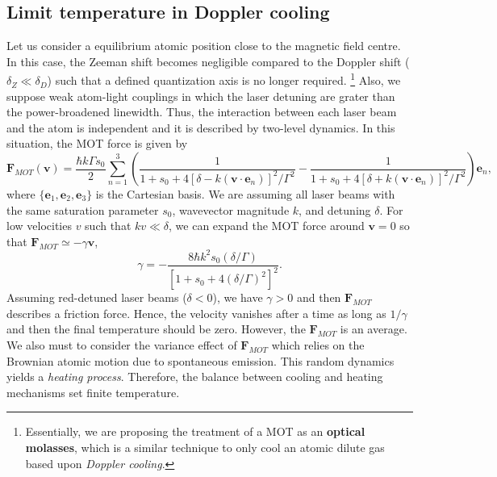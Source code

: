 \subsection{Limit temperature in Doppler cooling}
\label{sec:Doppler-temperature-limit}

Let us consider a equilibrium atomic position close to the magnetic field centre. In this case, the Zeeman shift becomes negligible compared to the Doppler shift ($ \delta_{Z} \ll \delta_{D} $) such that a defined quantization axis is no longer required. \footnote{Essentially, we are proposing the treatment of a MOT as an \textbf{optical molasses}, which is a similar technique to only cool an atomic dilute gas based upon \textit{Doppler cooling}.} Also, we suppose weak atom-light couplings in which the laser detuning are grater than the power-broadened linewidth. Thus, the interaction between each laser beam and the atom is independent and it is described by two-level dynamics. In this situation, the MOT force is given by
\begin{equation}
	\mathbf{F}_{MOT}(\mathbf{v}) = \frac{\hbar k \Gamma s_0}{2} \sum_{n = 1}^{3} \left( \frac{1}{1 + s_0 + 4[\delta - k (\mathbf{v} \cdot \mathbf{e}_n)]^2 / \Gamma^2} - \frac{1}{1 + s_0 + 4[\delta + k (\mathbf{v} \cdot \mathbf{e}_n)]^2 / \Gamma^2} \right)\mathbf{e}_{n},
\end{equation}
where $ \{ \mathbf{e}_1, \mathbf{e}_2, \mathbf{e}_3 \}$ is the Cartesian basis. We are assuming all laser beams with the same saturation parameter $ s_0 $, wavevector magnitude $ k $, and detuning $ \delta $. For low velocities $ v $ such that $ kv \ll \delta $, we can expand the MOT force around $ \mathbf{v} = 0 $ so that $ \mathbf{F}_{MOT} \simeq - \gamma \mathbf{v} $,
\begin{equation}
	\gamma = - \frac{8 \hbar k^2 s_0 (\delta / \Gamma)}{[1 + s_0 + 4(\delta / \Gamma)^2]^2}.
\end{equation}
Assuming red-detuned laser beams ($ \delta < 0 $), we have $ \gamma > 0 $ and then $ \mathbf{F}_{MOT} $ describes a friction force. Hence, the velocity vanishes after a time as long as $ 1 / \gamma $ and then the final temperature should be zero. However, the $ \mathbf{F}_{MOT} $ is an average. We also must to consider the variance effect of $ \mathbf{F}_{MOT} $ which relies on the Brownian atomic motion due to spontaneous emission. This random dynamics yields a \textit{heating process}. Therefore, the balance between cooling and heating mechanisms set finite temperature.

